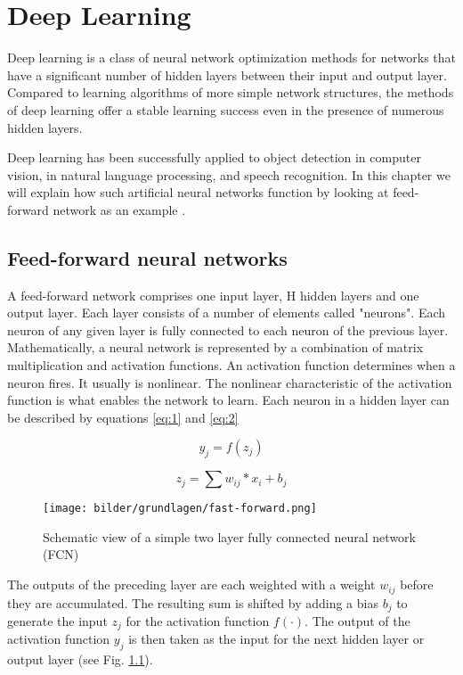 \chapter{Deep Learning}

Deep learning is a class of neural network optimization methods for networks that have
 a significant number of hidden layers between their input and output layer.
  Compared to learning algorithms of more simple network structures, the methods of 
  deep learning offer a stable learning success even in the presence of numerous hidden layers.

Deep learning has been successfully applied to object detection in computer vision, in natural language processing,
 and speech recognition. In this chapter we will explain how such artificial neural networks 
 function by looking at feed-forward network as an example \cite{Dao}. 

\section{Feed-forward neural networks}

A feed-forward network comprises one input layer, H hidden layers and one output layer.
Each layer consists of a number of elements called "neurons". Each neuron of any given layer is 
fully connected to each neuron
of the previous layer. Mathematically, a neural network is represented by a combination of 
matrix multiplication and
activation functions. An activation function determines when a neuron fires.
It usually is nonlinear. The nonlinear characteristic of the activation function is 
what enables the network to learn. Each neuron in a hidden layer can be described by equations \ref{eq:1} and  \ref{eq:2}

\begin{equation} \label{eq:1}
	y_{j} = f(z_{j})
\end{equation}

\begin{equation} \label{eq:2}
z_{j} = \sum w_{ij}*x_{i} + b_{j}
\end{equation}

\begin{figure}[H]
	\centering
	\texttt{[image: bilder/grundlagen/fast-forward.png]}
	\caption{Schematic view of a  simple two layer fully connected neural network (FCN)}
	\label{fig:FCN}
\end{figure}

The outputs of the preceding layer are each weighted with a weight \(w_{ij}\) before they are accumulated.
The resulting sum is shifted by adding a bias \(b_{j}\) to generate the input \(z_{j}\) for the 
activation function \( f(\cdot) \).
The output of the activation function \(y_{j}\) is then taken as the input for the next 
hidden layer or output layer (see Fig. \ref{fig:FCN}).
 
